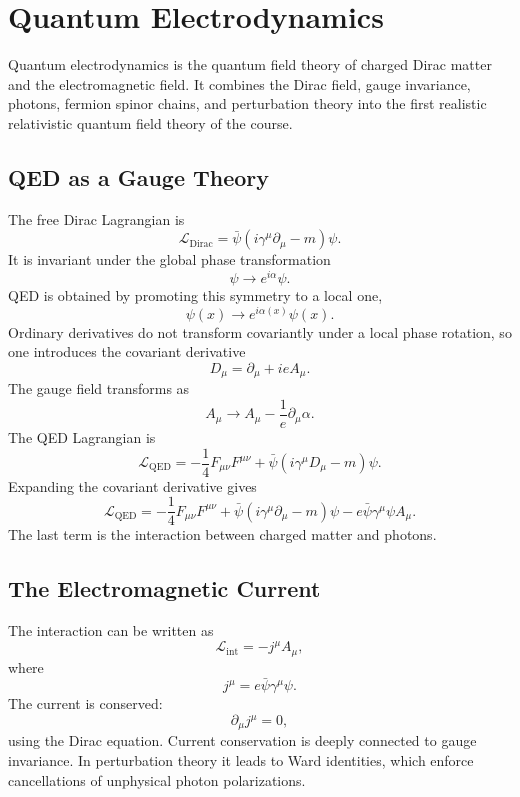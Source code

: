 \chapter{Quantum Electrodynamics}

\begin{remarkbox}
Quantum electrodynamics is the quantum field theory of charged Dirac matter and
the electromagnetic field. It combines the Dirac field, gauge invariance,
photons, fermion spinor chains, and perturbation theory into the first realistic
relativistic quantum field theory of the course.
\end{remarkbox}

\section{QED as a Gauge Theory}

The free Dirac Lagrangian is
\[
    \mathcal{L}_{\mathrm{Dirac}}
    = \bar\psi(i\gamma^\mu\partial_\mu-m)\psi.
\]
It is invariant under the global phase transformation
\[
    \psi\longrightarrow e^{i\alpha}\psi.
\]
QED is obtained by promoting this symmetry to a local one,
\[
    \psi(x)\longrightarrow e^{i\alpha(x)}\psi(x).
\]
Ordinary derivatives do not transform covariantly under a local phase rotation,
so one introduces the covariant derivative
\[
    D_\mu=\partial_\mu+ieA_\mu.
\]
The gauge field transforms as
\[
    A_\mu\longrightarrow A_\mu-\frac{1}{e}\partial_\mu\alpha.
\]
The QED Lagrangian is
\[
    \mathcal{L}_{\mathrm{QED}}
    = -\frac{1}{4}F_{\mu\nu}F^{\mu\nu}
      +\bar\psi(i\gamma^\mu D_\mu-m)\psi.
\]
Expanding the covariant derivative gives
\[
    \mathcal{L}_{\mathrm{QED}}
    = -\frac{1}{4}F_{\mu\nu}F^{\mu\nu}
      +\bar\psi(i\gamma^\mu\partial_\mu-m)\psi
      -e\bar\psi\gamma^\mu\psi A_\mu.
\]
The last term is the interaction between charged matter and photons.

\section{The Electromagnetic Current}

The interaction can be written as
\[
    \mathcal{L}_{\mathrm{int}}
    = -j^\mu A_\mu,
\]
where
\[
    j^\mu=e\bar\psi\gamma^\mu\psi.
\]
The current is conserved:
\[
    \partial_\mu j^\mu=0,
\]
using the Dirac equation. Current conservation is deeply connected to gauge
invariance. In perturbation theory it leads to Ward identities, which enforce
cancellations of unphysical photon polarizations.

